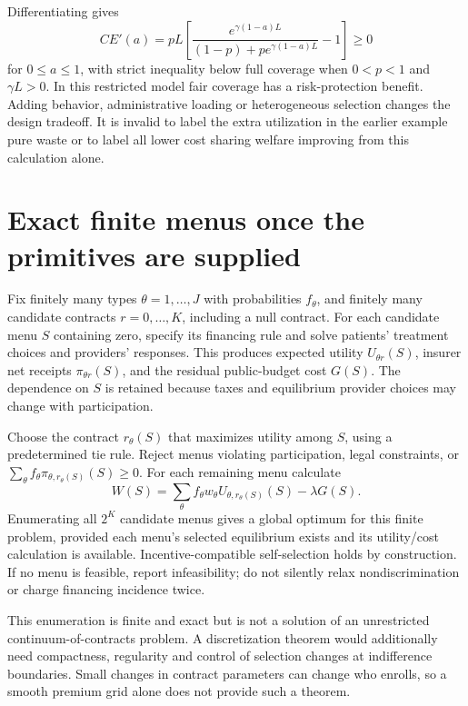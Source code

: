 \documentclass[11pt]{article}
\begin{document}
Differentiating gives
\[
 CE'(a)=pL\left[\frac{e^{\gamma(1-a)L}}{(1-p)+p e^{\gamma(1-a)L}}-1\right]\geq0
\]
for $0\leq a\leq1$, with strict inequality below full coverage when $0<p<1$ and $\gamma L>0$. In this restricted model fair coverage has a risk-protection benefit. Adding behavior, administrative loading or heterogeneous selection changes the design tradeoff. It is invalid to label the extra utilization in the earlier example pure waste or to label all lower cost sharing welfare improving from this calculation alone.

\section*{Exact finite menus once the primitives are supplied}
Fix finitely many types $\theta=1,\ldots,J$ with probabilities $f_\theta$, and finitely many candidate contracts $r=0,\ldots,K$, including a null contract. For each candidate menu $S$ containing zero, specify its financing rule and solve patients' treatment choices and providers' responses. This produces expected utility $U_{\theta r}(S)$, insurer net receipts $\pi_{\theta r}(S)$, and the residual public-budget cost $G(S)$. The dependence on $S$ is retained because taxes and equilibrium provider choices may change with participation.

Choose the contract $r_\theta(S)$ that maximizes utility among $S$, using a predetermined tie rule. Reject menus violating participation, legal constraints, or
$\sum_\theta f_\theta\pi_{\theta,r_\theta(S)}(S)\geq0$.
For each remaining menu calculate
\[
 W(S)=\sum_\theta f_\theta w_\theta U_{\theta,r_\theta(S)}(S)-\lambda G(S).
\]
Enumerating all $2^K$ candidate menus gives a global optimum for this finite problem, provided each menu's selected equilibrium exists and its utility/cost calculation is available. Incentive-compatible self-selection holds by construction. If no menu is feasible, report infeasibility; do not silently relax nondiscrimination or charge financing incidence twice.

This enumeration is finite and exact but is not a solution of an unrestricted continuum-of-contracts problem. A discretization theorem would additionally need compactness, regularity and control of selection changes at indifference boundaries. Small changes in contract parameters can change who enrolls, so a smooth premium grid alone does not provide such a theorem.
\end{document}
